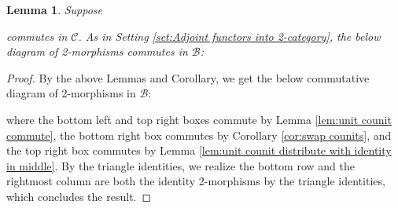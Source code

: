\documentclass{article}
\newcommand{\fB}{\mathscr{B}}
\newcommand{\fC}{\mathscr{C}}
\newtheorem{lemma}[theorem]{Lemma}
\begin{document}
\begin{lemma}\label{lem:2.7.F generalization}
    Suppose 
    commutes in $\fC$. As in Setting \ref{set:Adjoint functors into 2-category}, the below diagram of 2-morphisms commutes in $\fB$:
    \begin{center}
    \end{center}
\end{lemma}
\begin{proof}
    By the above Lemmas and Corollary, we get the below commutative diagram of 2-morphisms in $\fB$:
    \begin{center}
    \end{center}
    where the bottom left and top right boxes commute by Lemma \ref{lem:unit counit commute}, the bottom right box commutes by Corollary \ref{cor:swap counits}, and the top right box commutes by Lemma \ref{lem:unit counit distribute with identity in middle}. By the triangle identities, we realize the bottom row and the rightmost column are both the identity 2-morphisms by the triangle identities, which concludes the result.
\end{proof}
\end{document}
